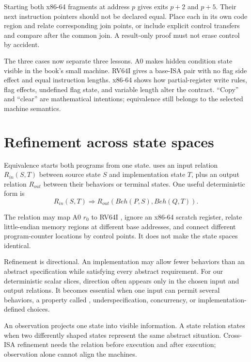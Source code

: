 \begin{warning}[title={Do not compare unequal-length fragments at one numeric exit}]
Starting both x86-64 fragments at address \(p\) gives exits \(p+2\) and \(p+5\).
Their next instruction pointers should not be declared equal. Place each in
its own code region and relate corresponding join points, or include explicit
control transfers and compare after the common join. A result-only proof must
not erase control by accident.
\end{warning}

The three cases now separate three lessons. A0 makes hidden condition state
visible in the book's small machine. RV64I gives a base-ISA pair with no flag
side effect and equal instruction lengths. x86-64 shows how partial-register
write rules, flag effects, undefined flag state, and variable length alter the
contract. ``Copy'' and ``clear'' are mathematical intentions; equivalence
still belongs to the selected machine semantics.

\section{Refinement across state spaces}

Equivalence starts both programs from one state.  uses an
input relation \(R_{in}(S,T)\) between source state \(S\) and implementation
state \(T\), plus an output relation \(R_{out}\) between their behaviors or
terminal states. One useful deterministic form is
\[
  R_{in}(S,T)\Longrightarrow
  R_{out}(\mathit{Beh}(P,S),\mathit{Beh}(Q,T)).
\]

The relation may map A0 \(r_0\) to RV64I , ignore an x86-64 scratch
register, relate little-endian memory regions at different base addresses, and
connect different program-counter locations by control points. It does not
make the state spaces identical.

Refinement is directional. An implementation may allow fewer behaviors than
an abstract specification while satisfying every abstract requirement. For
our deterministic scalar slices, direction often appears only in the chosen
input and output relations. It becomes essential when one input can permit
several behaviors, a property called ,
underspecification, concurrency, or implementation-defined choices.

\begin{keyidea}[title={A relation carries meaning across machines}]
An observation projects one state into visible information. A state relation
states when two differently shaped states represent the same abstract
situation. Cross-ISA refinement needs the relation before execution and after
execution; observation alone cannot align the machines.
\end{keyidea}

